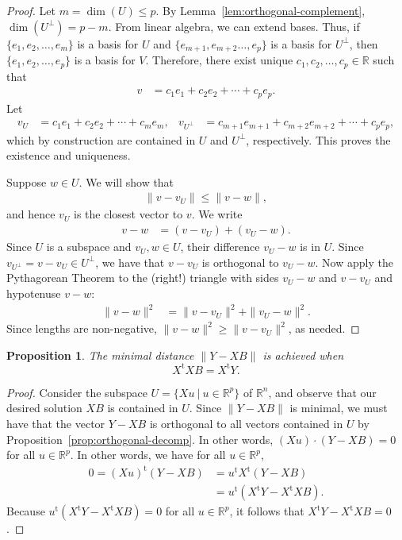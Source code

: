 \documentclass[a4paper, 12pt]{article}
\numberwithin{equation}{section}
\numberwithin{figure}{section}
\newtheorem{prop}[thm]{Proposition}
\theoremstyle{definition}
\renewcommand{\leq}{\leqslant}
\renewcommand{\geq}{\geqslant}
\newcommand{\R}{\mathbb{R}}
\newcommand{\tr}{\mathrm{t}}
\begin{document}
\begin{proof}
	Let $m=\dim(U)\leq p$. By Lemma~\ref{lem:orthogonal-complement},
	$\dim(U^{\perp})=p-m$. From linear algebra, we can extend bases. Thus, if
	$\{e_1, e_2, \dots, e_m\}$ is a basis for $U$ and $\{e_{m+1},e_{m+2}\dots,
	e_{p}\}$ is a basis for $U^{\perp}$, then $\{e_1,e_2,\dots, e_p\}$ is a
	basis for $V$. Therefore, there exist unique $c_1,c_2,\dots, c_p\in \R$ such
	that 
	\begin{align*}
		v &= c_1e_1 + c_2e_2 + \cdots + c_pe_p.
	\end{align*}
	Let 
	\begin{align*}
		v_{U} &= c_1e_1 + c_2e_2 + \cdots + c_me_m, & v_{U^{\perp}} &= c_{m+1}e_{m+1} + c_{m+2}e_{m+2} + \cdots + c_pe_p,
	\end{align*}
	which by construction are contained in $U$ and $U^{\perp}$, respectively.
	This proves the existence and uniqueness. 

	Suppose $w\in U$. We will show that 
	\begin{align*}
		\| v - v_U \| \leq \| v - w \|,
	\end{align*}
	and hence $v_U$ is the closest vector to $v$. We write
	\begin{align*}
		v - w &= (v - v_U) + (v_U - w).
	\end{align*}
	Since $U$ is a subspace and $v_U,w\in U$, their difference $v_U-w$ is in
	$U$. Since $v_{U^{\perp}} = v - v_U\in U^{\perp}$, we have that $v-v_U$ is
	orthogonal to $v_U-w$. Now apply the Pythagorean Theorem to the (right!)
	triangle with sides $v_U-w$ and $v-v_U$ and hypotenuse $v-w$: 
	\begin{align*}
		\|v - w\|^2 &= \|v - v_U\|^2 + \|v_U - w\|^2.
	\end{align*}
	Since lengths are non-negative, $\|v - w\|^2 \geq \|v - v_U\|^2$, as needed.
\end{proof}

\begin{prop}
	The minimal distance $\| Y - XB \|$ is achieved when
	\[ 
		X^{\tr} X B = X^{\tr} Y.
	\] 
\end{prop}

\begin{proof} 
	Consider the subspace $U = \{Xu ~|~ u\in\R^p\}$ of $\R^n$, and observe that
	our desired solution $XB$ is contained in $U$. Since $\| Y - XB \|$ is
	minimal, we must have that the vector $Y - XB$ is orthogonal to all vectors
	contained in $U$ by Proposition~\ref{prop:orthogonal-decomp}. In other
	words, $(Xu) \cdot (Y - XB) = 0$ for all $u\in\R^p$. In other words, we have
	for all $u\in \R^p$,
	\begin{align*} 
		0 = (Xu)^{\tr} (Y - XB) &= u^{\tr} X^{\tr}(Y - XB) \\
		&= u^{\tr} \left(X^{\tr}Y - X^{\tr}XB\right).
	\end{align*}
	Because $u^{\tr} \left(X^{\tr}Y - X^{\tr}XB\right)=0$ for all $u\in \R^p$,
	it follows that $X^{\tr}Y - X^{\tr}XB=0$. 
\end{proof}
\end{document}
